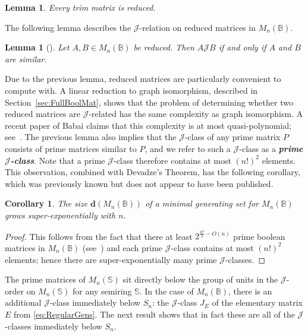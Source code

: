 \documentclass[11pt]{article}
\newtheorem{cor}[thm]{Corollary}
\newtheorem{lemma}[thm]{Lemma}
\newcommand{\defn}[1]{\textbf{\textit{#1}}}
\numberwithin{equation}{section}
\newcommand{\B}{\mathbb{B}}
\newcommand{\Bn}{M_n(\B)}
\newcommand{\J}{\mathscr{J}}
\begin{document}
\begin{lemma}
  Every trim matrix is reduced.
\end{lemma}

The following lemma describes the $\J$-relation on reduced matrices in $\Bn$.

\begin{lemma}[{\cite[Theorem 1.8]{Plemmons1970aa}}]
  Let $A, B \in \Bn$ be reduced. Then $A \J B$ if and only if $A$ and $B$ are
  similar.
\end{lemma}

Due to the previous lemma, reduced matrices are particularly convenient to
compute with. A linear reduction to graph isomorphism, described in
Section~\ref{sec:FullBoolMat}, shows that the problem of determining whether two
reduced matrices are $\J$-related has the same complexity as graph isomorphism.
A recent paper of Babai claims that this complexity is at most quasi-polynomial;
see~\cite{Babai2016aa}.
The previous lemma also implies that the $\J$-class of any prime matrix $P$
consists of prime matrices similar to $P$, and we refer to such a $\J$-class as
a \defn{prime $\J$-class}. Note that a prime $\J$-class therefore contains at
most $(n!)^2$ elements. This observation, combined with Devadze's Theorem, has
the following corollary, which was previously known but does not appear to have
been published.

\begin{cor}
  The size $\mathbf{d}(\Bn)$ of a minimal generating set for $\Bn$ grows
  super-exponentially with $n$.
\end{cor}
\begin{proof}
  This follows from the fact that there at least $2^{\frac{n^2}{4} - O(n)}$
  prime boolean matrices in $\Bn$ (see~\cite[Theorem 2.4.1]{Kim1982aa}) and each
  prime $\J$-class contains at most $(n!)^2$ elements; hence there are
  super-exponentially many prime $\J$-classes.
\end{proof}

The prime matrices of $M_n(\mathbb{S})$ sit directly below the group of units in
the $\J$-order on $M_n(\mathbb{S})$ for any semiring $\mathbb{S}$. In the case
of $\Bn$, there is an additional $\J$-class immediately below $S_n$: the
$\J$-class $J_E$ of the elementary matrix $E$ from \eqref{eq:RegularGens}. The
next result shows that in fact these are all of the $\J$-classes immediately
below $S_n$.
\end{document}
